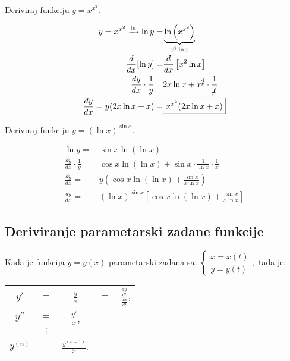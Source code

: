\begin{multicols}{2}
\begin{example}
    Deriviraj funkciju $y=x^{x^2}$.
\end{example}

\begin{align*}
    y=x^{x^2} \xrightarrow{\ln} \ln y=& \underbrace{\ln \left(x^{x^2}\right)}_{x^2 \ln x}\\
    \frac{d}{dx}[\ln y] =& \frac{d}{dx} \left[ x^2 \ln x \right]\\
    \frac{dy}{dx}\cdot\frac{1}{y}=& 2x \ln x + x^{\cancel{2}}\cdot\frac{1}{\cancel{x}}\\
    \frac{dy}{dx} = y (2x\ln x + x) =& \boxed{x^{x^2} (2x\ln x + x)}
\end{align*}

\columnbreak

\begin{example}
    Deriviraj funkciju $y=(\ln x)^{\sin x}$.
\end{example}

\begin{align*}
    \ln y = &\sin x \ln (\ln x)\\
    \frac{dy}{dx}\cdot\frac{1}{y} =& \cos x \ln (\ln x) + \sin x \cdot \frac{1}{\ln x} \cdot \frac{1}{x}\\
    \frac{dy}{dx} =& y (\cos x \ln (\ln x) + \frac{\sin x}{x \ln x})\\
    \frac{dy}{dx} =& \boxed{(\ln x)^{\sin x}\left[\cos x \ln (\ln x) + \frac{\sin x}{x \ln x}\right]}
\end{align*}

\end{multicols}


\subsection{Deriviranje parametarski zadane funkcije}

Kada je funkcija $y=y(x)$ parametarski zadana sa: $\displaystyle
\begin{cases}
    x = x(t)\\
    y = y(t)
\end{cases},
$ tada je:

\begin{center}
    \begin{tabular}{ccccc}
    $y'$&$=$&$\displaystyle\frac{\dot{y}}{\dot{x}}$&$=$&$\displaystyle\frac{\frac{dy}{dt}}{\frac{dx}{dt}}$,\\
    $y''$&$=$&$\displaystyle\frac{\dot{y'}}{\dot{x}}$,\\
    &$\vdots$&\\
    $y^{(n)}$&$=$&$\displaystyle\frac{\dot{y^{(n-1)}}}{\dot{x}}$.
    \end{tabular}
\end{center}

